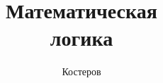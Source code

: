 \documentclass[titlepage, nofonts, nobib]{tufte-handout}
\author{Костеров}
\title{Математическая\\ логика}
\begin{document}
\maketitle

\setcounter{tocdepth}{1}
\tableofcontents

\pagebreak


\pagebreak


\pagebreak


\pagebreak


\pagebreak


\begin{fullwidth}
  \newcommand\letterheading[1]{
    \par\textbf{#1}\par\nopagebreak
  }
  \printindex
\end{fullwidth}
\end{document}
